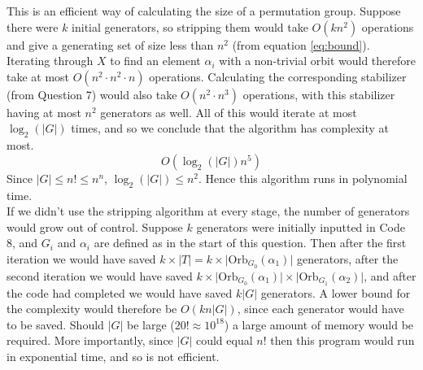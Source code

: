 \documentclass[10pt,a4paper,notitlepage]{article}
\newcommand{\abs}[1]{\lvert#1\rvert}
\newcommand{\Orb}{\text{Orb}}
\begin{document}
This is an efficient way of calculating the size of a permutation group. Suppose there were $k$ initial generators, so stripping them would take $O(kn^{2})$ operations and give a generating set of size less than $n^{2}$ (from equation \eqref{eq:bound}). Iterating through $X$ to find an element $\alpha_{i}$ with a non-trivial orbit would therefore take at most $O(n^{2}\cdot n^{2}\cdot n)$ operations. Calculating the corresponding stabilizer (from Question 7) would also take $O(n^{2}\cdot n^{3})$ operations, with this stabilizer having at most $n^{2}$ generators as well. All of this would iterate at most $\log_{2}\left(\abs{G}\right)$ times, and so we conclude that the algorithm has complexity at most.
\begin{equation}
O\left(\log_{2}\left(\abs{G}\right)n^{5}\right)
\end{equation}
Since $\abs{G}\leq n!\leq n^{n}$, $\log_{2}\left(\abs{G}\right)\leq n^{2}$. Hence this algorithm runs in polynomial time.\\

If we didn't use the stripping algorithm at every stage, the number of generators would grow out of control. Suppose $k$ generators were initially inputted in Code 8,  and $G_{i}$ and $\alpha_{i}$ are defined as in the start of this question. Then after the first iteration we would have saved $k\times\abs{T}=k\times \abs{\Orb_{G_{0}}(\alpha_{1})}$ generators, after the second iteration we would have saved $k\times \abs{\Orb_{G_{0}}(\alpha_{1})}\times \abs{\Orb_{G_{1}}(\alpha_{2})}$, and after the code had completed we would have saved $k\abs{G}$ generators. A lower bound for the complexity would therefore be $O(kn\abs{G})$, since each generator would have to be saved. Should $\abs{G}$ be large ($20!\approx 10^{18}$) a large amount of memory would be required. More importantly, since $\abs{G}$ could equal $n!$ then this program would run in exponential time, and so is not efficient.\\
\end{document}
